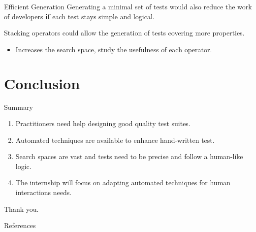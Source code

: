 \documentclass{beamer}
\begin{document}
\begin{frame}{Efficient Generation}
  Generating a minimal set of tests would also reduce the work of developers \textbf{if} each test stays simple and logical.

  Stacking operators could allow the generation of tests covering more properties.
  \begin{itemize}
    \item Increases the search space, study the usefulness of each operator.
  \end{itemize}
\end{frame}


\section*{Conclusion}

\begin{frame}{Summary}
  \begin{enumerate}
    \item Practitioners need help designing good quality test suites.
    \item Automated techniques are available to enhance hand-written test.
    \item Search spaces are vast and tests need to be precise and follow a human-like logic.
    \item The internship will focus on adapting automated techniques for human interactions needs.
  \end{enumerate}
\end{frame}

\begin{frame}[standout]
  Thank you.
\end{frame}

\appendix

\begin{frame}[allowframebreaks]{References}
  
  
\end{frame}
\end{document}
